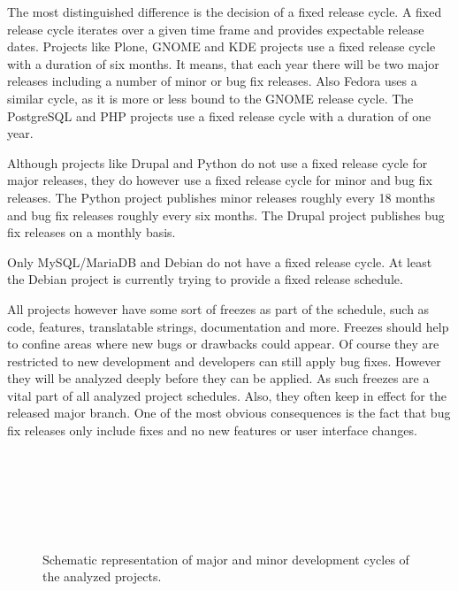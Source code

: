 The most distinguished difference is the decision of a fixed release cycle. A
fixed release cycle iterates over a given time frame and provides expectable
release dates. Projects like Plone, GNOME and KDE projects use a fixed release
cycle with a duration of six months. It means, that each year there will be two
major releases including a number of minor or bug fix releases. Also Fedora uses
a similar cycle, as it is more or less bound to the GNOME release cycle. The
PostgreSQL and PHP projects use a fixed release cycle with a duration of one
year.

Although projects like Drupal and Python do not use a fixed release cycle for
major releases, they do however use a fixed release cycle for minor and bug fix
releases. The Python project publishes minor releases roughly every 18 months
and bug fix releases roughly every six months. The Drupal project publishes
bug fix releases on a monthly basis.

Only MySQL/MariaDB and Debian do not have a fixed release cycle. At least the
Debian project is currently trying to provide a fixed release schedule.

All projects however have some sort of freezes as part of the schedule, such as
code, features, translatable strings, documentation and more. Freezes should
help to confine areas where new bugs or drawbacks could appear. Of course they
are restricted to new development and developers can still apply bug fixes.
However they will be analyzed deeply before they can be applied. As such
freezes are a vital part of all analyzed project schedules. Also, they often
keep in effect for the released major branch. One of the most obvious
consequences is the fact that bug fix releases only include fixes and no new
features or user interface changes.

\begin{figure}[htbp]
  \centering
   \qquad
   \\

   \qquad
   \\

   \qquad
   \\

   \qquad
   \\

   \qquad
   \\
  \caption[Representation of Development Cycles]
  {Schematic representation of major and minor development cycles of the
    analyzed projects.}
\end{figure}

